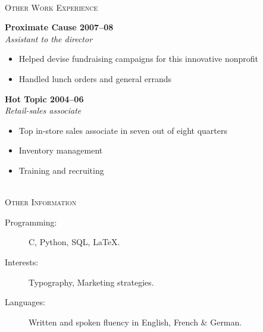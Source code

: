 \documentclass[11pt]{article}
\newcommand{\linehead}[1]	%
	{\vspace{5mm} 
	{\color{cvColour}
	\hrulefill \\ 
	{\large 
	\textsc{{#1}}}}}
\newcommand{\bighead}[1]
	{\vspace{5mm} 
	{\large 
	{\textbf {#1}}}}
\newcommand{\ithead}[1]
	{{\large 
	{\textit {#1}}}}
\begin{document}

\linehead{Other Work Experience}

\bighead{Proximate Cause \hfill 2007–08} \\
\ithead{Assistant to the director}
\begin{itemize}
    \item Helped devise fundraising campaigns for this innovative nonprofit
    \item Handled lunch orders and general errands
\end{itemize}

\bighead{Hot Topic \hfill 2004–06} \\
\ithead{Retail-sales associate}
\begin{itemize}
    \item Top in-store sales associate in seven out of eight quarters
    \item Inventory management
    \item Training and recruiting
\end{itemize}



\linehead{Other Information}
\begin{description}
\item[Programming:] C, Python, SQL, \LaTeX.
\item[Interests:] Typography, Marketing strategies.
\item[Languages:] Written and spoken fluency in English, French \& German.
\end{description}
\end{document}

